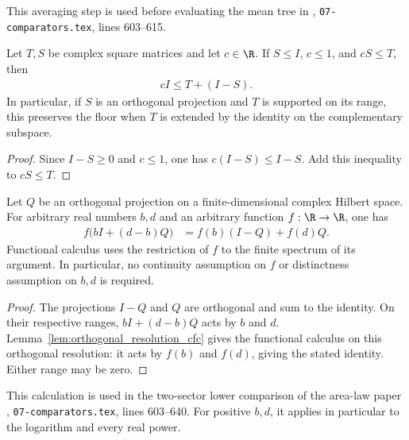 This averaging step is used before evaluating the mean tree in
\cite[proof of the two-sector lower comparison]{OpenAI2026AreaLaw},
\texttt{07-comparators.tex}, lines 603--615.


\begin{theorem}
    \label{thm:area_law_identity_extension_floor}
    Let $T,S$ be complex square matrices and let $c\in\R$. If
    $S\le I$, $c\le1$, and $cS\le T$, then
    \begin{align}
        cI\le T+(I-S).
    \end{align}
    In particular, if $S$ is an orthogonal projection and $T$ is
    supported on its range, this preserves the floor when $T$ is
    extended by the identity on the complementary subspace.
\end{theorem}

\begin{proof}
    Since $I-S\ge0$ and $c\le1$, one has $c(I-S)\le I-S$.
    Add this inequality to $cS\le T$.
\end{proof}

\begin{theorem}
    \label{thm:area_law_affine_projection_calculus}
    Let $Q$ be an orthogonal projection on a finite-dimensional complex
    Hilbert space. For arbitrary real numbers $b,d$ and an arbitrary
    function $f:\R\to\R$, one has
    \begin{align}
        f\bigl(bI+(d-b)Q\bigr)
        &=f(b)(I-Q)+f(d)Q.
    \end{align}
    Functional calculus uses the restriction of $f$ to the finite
    spectrum of its argument. In particular, no continuity assumption
    on $f$ or distinctness assumption on $b,d$ is required.
\end{theorem}

\begin{proof}
    The projections $I-Q$ and $Q$ are orthogonal and sum to the identity.
    On their respective ranges, $bI+(d-b)Q$ acts by $b$ and $d$.
    Lemma~\ref{lem:orthogonal_resolution_cfc} gives the functional
    calculus on this orthogonal resolution: it acts by $f(b)$
    and $f(d)$, giving the stated identity. Either range may be zero.
\end{proof}

This calculation is used in the two-sector lower comparison of the
area-law paper \cite[proof of the two-sector lower comparison]{OpenAI2026AreaLaw},
\texttt{07-comparators.tex}, lines 603--640. For positive
$b,d$, it applies in particular to the logarithm and every real power.
